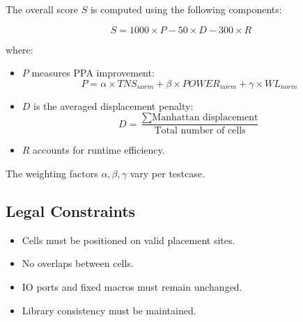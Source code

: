 \documentclass[conference]{IEEEtran}
\begin{document}
The overall score \(S\) is computed using the following components:

\begin{equation}
    S = 1000 \times P - 50 \times D - 300 \times R
\end{equation}

where:
\begin{itemize}
    \item \(P\) measures PPA improvement:
    \begin{equation}
        P = \alpha \times TNS_{norm} + \beta \times POWER_{norm} + \gamma \times WL_{norm}
    \end{equation}
    \item \(D\) is the averaged displacement penalty:
    \begin{equation}
        D = \frac{\sum \text{Manhattan displacement}}{\text{Total number of cells}}
    \end{equation}
    \item \(R\) accounts for runtime efficiency.
\end{itemize}

The weighting factors \(\alpha, \beta, \gamma\) vary per testcase.

\subsection{Legal Constraints}
\begin{itemize}
    \item Cells must be positioned on valid placement sites.
    \item No overlaps between cells.
    \item IO ports and fixed macros must remain unchanged.
    \item Library consistency must be maintained.
\end{itemize}
\end{document}
